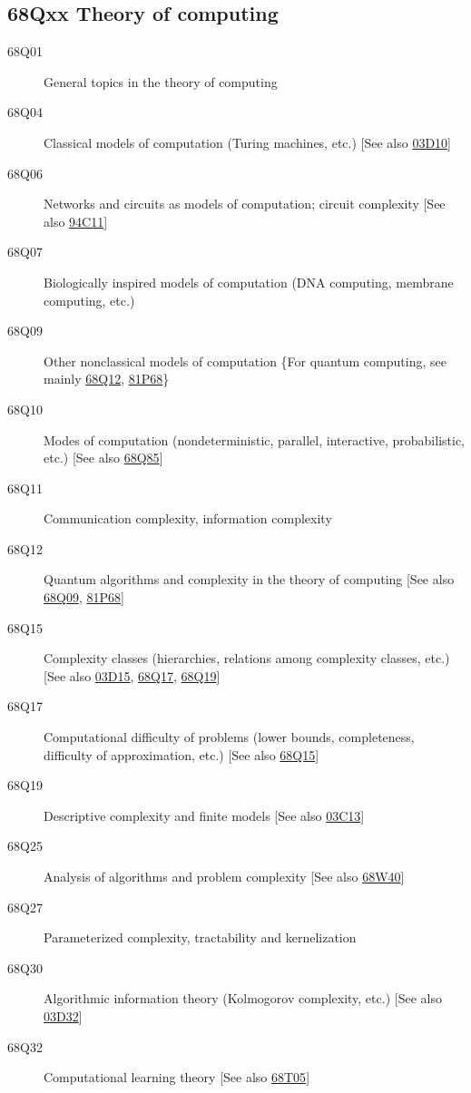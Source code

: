 \documentclass[letterpaper]{article}
\begin{document}
\subsection*{68Qxx  Theory of computing }\label{68Qxx}
\begin{description}
\item [68Q01]\label{68Q01} General topics in the theory of computing
\item [68Q04]\label{68Q04} Classical models of computation (Turing machines, etc.) [See also \hyperref[03D10]{03D10}]
\item [68Q06]\label{68Q06} Networks and circuits as models of computation; circuit complexity [See also \hyperref[94C11]{94C11}]
\item [68Q07]\label{68Q07} Biologically inspired models of computation (DNA computing, membrane computing, etc.) 
\item [68Q09]\label{68Q09} Other nonclassical models of computation \{For quantum computing, see mainly \hyperref[68Q12]{68Q12}, \hyperref[81P68]{81P68}\}
\item [68Q10]\label{68Q10} Modes of computation (nondeterministic, parallel, interactive, probabilistic, etc.) [See also \hyperref[68Q85]{68Q85}]
\item [68Q11]\label{68Q11} Communication complexity, information complexity
\item [68Q12]\label{68Q12} Quantum algorithms and complexity in the theory of computing [See also \hyperref[68Q09]{68Q09}, \hyperref[81P68]{81P68}]
\item [68Q15]\label{68Q15} Complexity classes (hierarchies, relations among complexity classes, etc.) [See also \hyperref[03D15]{03D15}, \hyperref[68Q17]{68Q17}, \hyperref[68Q19]{68Q19}]
\item [68Q17]\label{68Q17} Computational difficulty of problems (lower bounds, completeness, difficulty of approximation, etc.) [See also \hyperref[68Q15]{68Q15}]
\item [68Q19]\label{68Q19} Descriptive complexity and finite models [See also \hyperref[03C13]{03C13}]
\item [68Q25]\label{68Q25} Analysis of algorithms and problem complexity [See also \hyperref[68W40]{68W40}]
\item [68Q27]\label{68Q27} Parameterized complexity, tractability and kernelization
\item [68Q30]\label{68Q30} Algorithmic information theory (Kolmogorov complexity, etc.) [See also \hyperref[03D32]{03D32}]
\item [68Q32]\label{68Q32} Computational learning theory [See also \hyperref[68T05]{68T05}]

\end{description}
\end{document}
